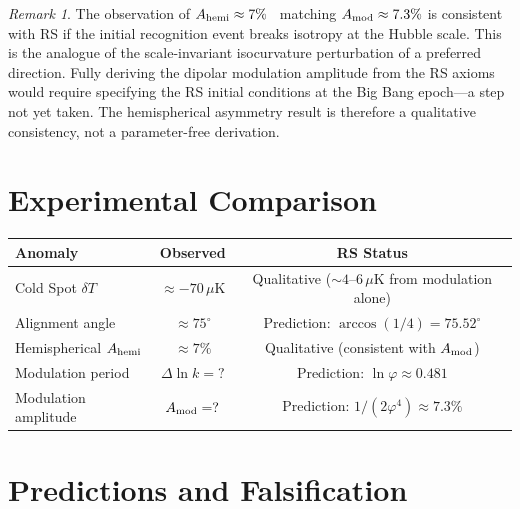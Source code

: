 \documentclass[12pt,a4paper]{article}
\theoremstyle{definition}
\theoremstyle{remark}
\newtheorem{remark}[theorem]{Remark}
\begin{document}
\begin{remark}
The observation of $A_{\rm hemi} \approx 7\%$~\cite{Planck2020VII}
matching $A_{\rm mod} \approx 7.3\%$ is consistent with RS if the
initial recognition event breaks isotropy at the Hubble scale.  This
is the analogue of the scale-invariant isocurvature perturbation of a
preferred direction.  Fully deriving the dipolar modulation amplitude
from the RS axioms would require specifying the RS initial conditions
at the Big Bang epoch---a step not yet taken.  The hemispherical
asymmetry result is therefore a qualitative consistency, not a
parameter-free derivation.
\end{remark}

\section{Experimental Comparison}
\label{sec:compare}

\begin{center}
\renewcommand{\arraystretch}{1.3}
\begin{tabular}{@{}lcc@{}}
\toprule
\textbf{Anomaly} & \textbf{Observed} & \textbf{RS Status} \\
\midrule
Cold Spot $\delta T$ & $\approx -70\,\mu$K & Qualitative ($\sim 4$--$6\,\mu$K from modulation alone) \\
Alignment angle & $\approx 75^\circ$ & Prediction: $\arccos(1/4) = 75.52^\circ$ \\
Hemispherical $A_{\rm hemi}$ & $\approx 7\%$ & Qualitative (consistent with $A_{\rm mod}$) \\
Modulation period & $\Delta\ln k = ?$ & Prediction: $\ln\varphi \approx 0.481$ \\
Modulation amplitude & $A_{\rm mod} = ?$ & Prediction: $1/(2\varphi^4) \approx 7.3\%$ \\
\bottomrule
\end{tabular}
\end{center}

\section{Predictions and Falsification}
\label{sec:predict}
\end{document}
